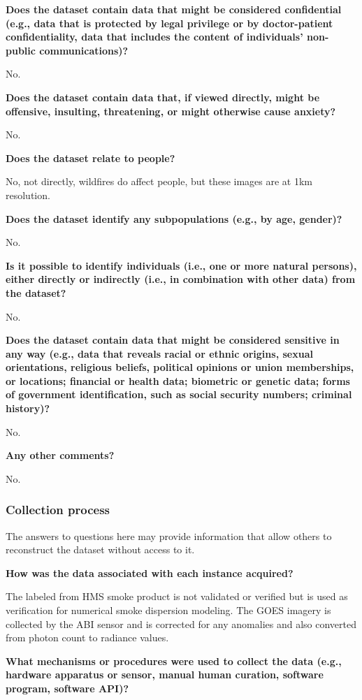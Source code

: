 \documentclass{article}
\begin{document}
\textbf{Does the dataset contain data that might be considered confidential (e.g., data that is protected by legal privilege or by doctor-patient confidentiality, data that includes the content of individuals’ non-public communications)?}

No.

\textbf{Does the dataset contain data that, if viewed directly, might be offensive, insulting, threatening, or might otherwise cause anxiety?}

No.

\textbf{Does the dataset relate to people? }

No, not directly, wildfires do affect people, but these images are at 1km resolution.

\textbf{Does the dataset identify any subpopulations (e.g., by age, gender)?}

No.

\textbf{Is it possible to identify individuals (i.e., one or more natural persons), either directly or indirectly (i.e., in combination with other data) from the dataset?}

No.

\textbf{Does the dataset contain data that might be considered sensitive in any way (e.g., data that reveals racial or ethnic origins, sexual orientations, religious beliefs, political opinions or union memberships, or locations; financial or health data; biometric or genetic data; forms of government identification, such as social security numbers; criminal history)?}

No.

\textbf{Any other comments?}

No.


\subsubsection{Collection process}

The answers to questions here may provide information that allow others to reconstruct the dataset without access to it.

\textbf{How was the data associated with each instance acquired?}

The labeled from HMS smoke product is not validated or verified but is used as verification for numerical smoke dispersion modeling. The GOES imagery is collected by the ABI sensor and is corrected for any anomalies and also converted from photon count to radiance values.

\textbf{What mechanisms or procedures were used to collect the data (e.g., hardware apparatus or sensor, manual human curation, software program, software API)?}
\end{document}
